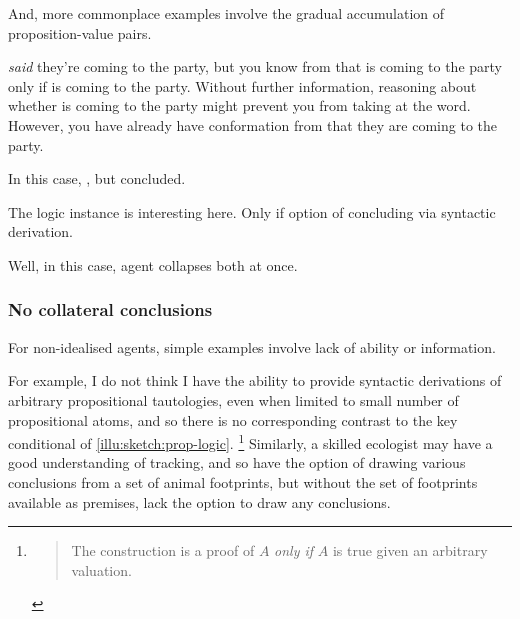 \begin{note}
  And, more commonplace examples involve the gradual accumulation of proposition-value pairs.

  \begin{illustration}
     \emph{said} they're coming to the party, but you know from  that  is coming to the party only if  is coming to the party.
    Without further information, reasoning about whether  is coming to the party might prevent you from taking  at the word.
    However, you have already have conformation from  that they are coming to the party.
  \end{illustration}
\end{note}

\begin{note}
  In this case, \requ{}, but concluded.
\end{note}

\begin{note}
  The logic instance is interesting here.
  Only if option of concluding via syntactic derivation.

  Well, in this case, agent collapses both at once.
\end{note}

\subsubsection{No collateral conclusions}

\begin{note}
  For non-idealised agents, simple examples involve lack of ability or information.

  For example, I do not think I have the ability to provide syntactic derivations of arbitrary propositional tautologies, even when limited to small number of propositional atoms, and so there is no corresponding contrast to the key conditional of \autoref{illu:sketch:prop-logic}.%
  \footnote{
    \begin{quote}
      The construction is a proof of \(A\) \emph{only if} \(A\) is true given an arbitrary valuation.
    \end{quote}
  }
  Similarly, a skilled ecologist may have a good understanding of tracking, and so have the option of drawing various conclusions from a set of animal footprints, but without the set of footprints available as premises, lack the option to draw any conclusions.
\end{note}


